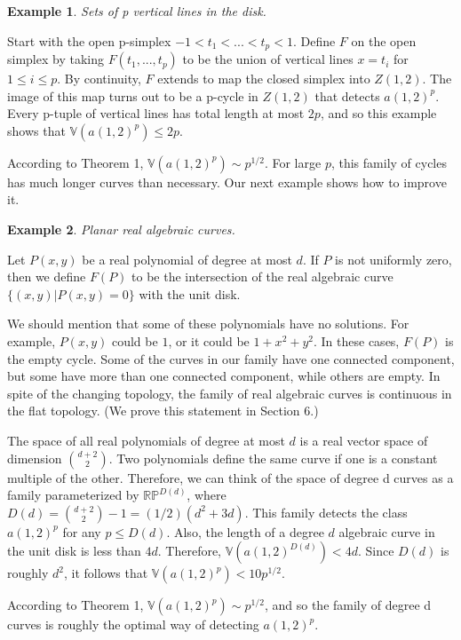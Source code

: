 \documentclass{amsart}
\newtheorem*{Theorem 1}{Theorem 1}
\newtheorem*{Theorem 2}{Theorem 2}
\newtheorem*{Theorem 1A}{Theorem 1A}
\newtheorem*{Theorem 2A}{Theorem 2A}
\newtheorem{introexample}{Example}
\newtheorem*{vanishing lemma}{Vanishing Lemma}
\numberwithin{equation}{section}
\begin{document}
\begin{introexample} Sets of p vertical lines in the disk.
\end{introexample}

Start with the open p-simplex $-1 < t_1 < ... < t_p < 1$.  Define
$F$ on the open simplex by taking $F(t_1, ..., t_p)$ to be the
union of vertical lines $x= t_i$ for $1 \le i \le p$.  By
continuity, $F$ extends to map the closed simplex into $Z(1,2)$. 
The image of this map turns out to be a p-cycle in $Z(1,2)$
that detects $a(1,2)^p$.  Every p-tuple of vertical lines
has total length at most $2p$, and so this example shows that
$\mathbb{V}(a(1,2)^p) \le 2p$.

According to Theorem 1, $\mathbb{V}(a(1,2)^p) \sim p^{1/2}$.  For
large $p$, this family of cycles has much longer curves than
necessary.  Our next example shows how to improve it.

\begin{introexample} Planar real algebraic curves.
\end{introexample}

Let $P(x,y)$ be a real polynomial of degree at most $d$.  If $P$
is not uniformly zero, then we define $F(P)$ to be the
intersection of the real algebraic curve $\{ (x,y) | P(x,y)=0
\}$ with the unit disk.

We should mention that some of these polynomials have no
solutions.  For example, $P(x,y)$ could be $1$, or it could be $1
+ x^2 + y^2$.  In these cases, $F(P)$ is the empty cycle.  Some
of the curves in our family have one connected component, but
some have more than one connected component, while others are
empty.  In spite of the changing topology, the family of real
algebraic curves is continuous in the flat topology.  (We prove
this statement in Section 6.)

The space of all real polynomials of degree at most $d$ is a real
vector space of dimension ${d+2 \choose 2}$.  Two polynomials
define the same curve if one is a constant multiple of the other. 
Therefore, we can think of the space of degree d curves as a
family parameterized by $\mathbb{RP}^{D(d)}$, where $D(d) = {d+2
\choose 2} - 1 = (1/2) (d^2 + 3d)$.  This family detects the class
$a(1,2)^p$ for any $p \le D(d)$.  Also, the length of a degree
$d$ algebraic curve in the unit disk is less than $4 d$. 
Therefore, $\mathbb{V}(a(1,2)^{D(d)}) < 4 d$.  Since $D(d)$ is
roughly $d^2$, it follows that $\mathbb{V}(a(1,2)^p) < 10
p^{1/2}$.

According to Theorem 1, $\mathbb{V}(a(1,2)^p) \sim p^{1/2}$,
and so the family of degree d curves is roughly the optimal way
of detecting $a(1,2)^p$.
\end{document}
